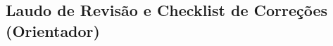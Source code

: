 \documentclass[
	11pt,				%
	openright,			%
	oneside,			%
	a4paper,			%
	english,			%
	brazil,				%
	]{abntex2}
\begin{document}



%
%










\begin{anexosenv}

\partanexos

\chapter{Laudo de Revisão e Checklist de Correções (Orientador)}

\clearpage

\end{anexosenv}


\end{document}
